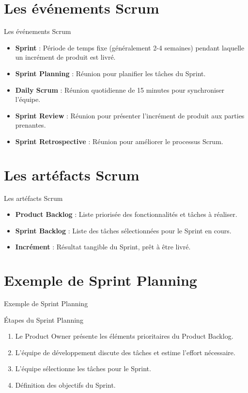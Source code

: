 \documentclass{clbeamer2024}
\begin{document}
	\section{Les événements Scrum}
	\begin{frame}{Les événements Scrum}
		\begin{itemize}
			\item \textbf{Sprint} : Période de temps fixe (généralement 2-4 semaines) pendant laquelle un incrément de produit est livré.
			\item \textbf{Sprint Planning} : Réunion pour planifier les tâches du Sprint.
			\item \textbf{Daily Scrum} : Réunion quotidienne de 15 minutes pour synchroniser l'équipe.
			\item \textbf{Sprint Review} : Réunion pour présenter l'incrément de produit aux parties prenantes.
			\item \textbf{Sprint Retrospective} : Réunion pour améliorer le processus Scrum.
		\end{itemize}
	\end{frame}
	
	\section{Les artéfacts Scrum}
	\begin{frame}{Les artéfacts Scrum}
		\begin{itemize}
			\item \textbf{Product Backlog} : Liste priorisée des fonctionnalités et tâches à réaliser.
			\item \textbf{Sprint Backlog} : Liste des tâches sélectionnées pour le Sprint en cours.
			\item \textbf{Incrément} : Résultat tangible du Sprint, prêt à être livré.
		\end{itemize}
	\end{frame}
	
	\section{Exemple de Sprint Planning}
	\begin{frame}[fragile]{Exemple de Sprint Planning}
		\begin{exampleblock}{Étapes du Sprint Planning}
			\begin{enumerate}
			
				\item Le Product Owner présente les éléments prioritaires du Product Backlog.
				\item L'équipe de développement discute des tâches et estime l'effort nécessaire.
				\item L'équipe sélectionne les tâches pour le Sprint.
				\item Définition des objectifs du Sprint.
			\end{enumerate}
		\end{exampleblock}
	\end{frame}
	
\end{document}
